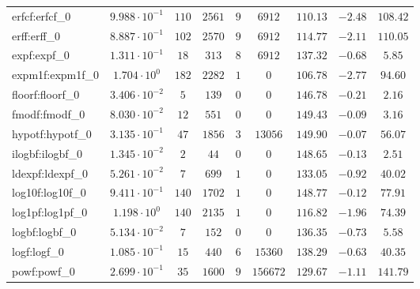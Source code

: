 \begin{tabular}{|l|c|c|c|c|c|c|c|c|}
erfcf:erfcf\_0               & $ 9.988 \cdot 10^{-1} $ & $ 110    $ & $ 2561  $ & $ 9   $ & $ 6912   $ & $ 110.13      $ & $ -2.48   $ & $ 108.42  $ \\
erff:erff\_0                 & $ 8.887 \cdot 10^{-1} $ & $ 102    $ & $ 2570  $ & $ 9   $ & $ 6912   $ & $ 114.77      $ & $ -2.11   $ & $ 110.05  $ \\
expf:expf\_0                 & $ 1.311 \cdot 10^{-1} $ & $ 18     $ & $ 313   $ & $ 8   $ & $ 6912   $ & $ 137.32      $ & $ -0.68   $ & $ 5.85    $ \\
expm1f:expm1f\_0             & $ 1.704 \cdot 10^{0}  $ & $ 182    $ & $ 2282  $ & $ 1   $ & $ 0      $ & $ 106.78      $ & $ -2.77   $ & $ 94.60   $ \\
floorf:floorf\_0             & $ 3.406 \cdot 10^{-2} $ & $ 5      $ & $ 139   $ & $ 0   $ & $ 0      $ & $ 146.78      $ & $ -0.21   $ & $ 2.16    $ \\
fmodf:fmodf\_0               & $ 8.030 \cdot 10^{-2} $ & $ 12     $ & $ 551   $ & $ 0   $ & $ 0      $ & $ 149.43      $ & $ -0.09   $ & $ 3.16    $ \\
hypotf:hypotf\_0             & $ 3.135 \cdot 10^{-1} $ & $ 47     $ & $ 1856  $ & $ 3   $ & $ 13056  $ & $ 149.90      $ & $ -0.07   $ & $ 56.07   $ \\
ilogbf:ilogbf\_0             & $ 1.345 \cdot 10^{-2} $ & $ 2      $ & $ 44    $ & $ 0   $ & $ 0      $ & $ 148.65      $ & $ -0.13   $ & $ 2.51    $ \\
ldexpf:ldexpf\_0             & $ 5.261 \cdot 10^{-2} $ & $ 7      $ & $ 699   $ & $ 1   $ & $ 0      $ & $ 133.05      $ & $ -0.92   $ & $ 40.02   $ \\
log10f:log10f\_0             & $ 9.411 \cdot 10^{-1} $ & $ 140    $ & $ 1702  $ & $ 1   $ & $ 0      $ & $ 148.77      $ & $ -0.12   $ & $ 77.91   $ \\
log1pf:log1pf\_0             & $ 1.198 \cdot 10^{0}  $ & $ 140    $ & $ 2135  $ & $ 1   $ & $ 0      $ & $ 116.82      $ & $ -1.96   $ & $ 74.39   $ \\
logbf:logbf\_0               & $ 5.134 \cdot 10^{-2} $ & $ 7      $ & $ 152   $ & $ 0   $ & $ 0      $ & $ 136.35      $ & $ -0.73   $ & $ 5.58    $ \\
logf:logf\_0                 & $ 1.085 \cdot 10^{-1} $ & $ 15     $ & $ 440   $ & $ 6   $ & $ 15360  $ & $ 138.29      $ & $ -0.63   $ & $ 40.35   $ \\
powf:powf\_0                 & $ 2.699 \cdot 10^{-1} $ & $ 35     $ & $ 1600  $ & $ 9   $ & $ 156672 $ & $ 129.67      $ & $ -1.11   $ & $ 141.79  $ \\

\end{tabular}
